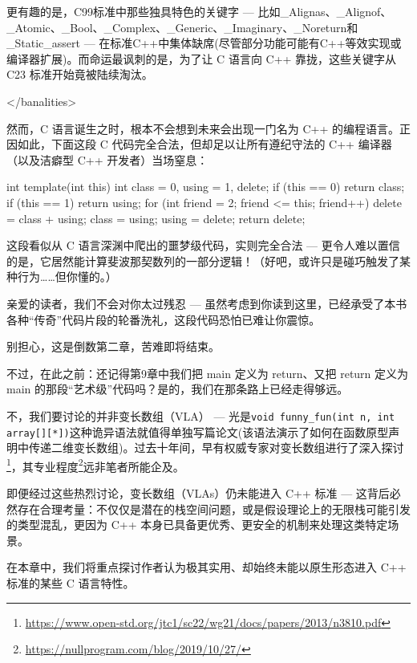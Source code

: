 更有趣的是，C99标准中那些独具特色的关键字 --- 比如\_Alignas、\_Alignof、\_Atomic、\_Bool、\_Complex、\_Generic、\_Imaginary、\_Noreturn和\_Static\_assert --- 在标准C++中集体缺席(尽管部分功能可能有C++等效实现或编译器扩展)。而命运最讽刺的是，为了让 C 语言向 C++ 靠拢，这些关键字从 C23 标准开始竟被陆续淘汰。

\begin{shell}
</banalities>
\end{shell}

然而，C 语言诞生之时，根本不会想到未来会出现一门名为 C++ 的编程语言。正因如此，下面这段 C 代码完全合法，但却足以让所有遵纪守法的 C++ 编译器（以及洁癖型 C++ 开发者）当场窒息：

\begin{cpp}
int template(int this) {
  int class = 0, using = 1, delete;
  if (this == 0) return class;
  if (this == 1) return using;
  for (int friend = 2; friend <= this; friend++) {
    delete = class + using;
    class = using;
    using = delete;
  }
  return delete;
}
\end{cpp}

这段看似从 C 语言深渊中爬出的噩梦级代码，实则完全合法 --- 更令人难以置信的是，它居然能计算斐波那契数列的一部分逻辑！（好吧，或许只是碰巧触发了某种行为……但你懂的。）

亲爱的读者，我们不会对你太过残忍 --- 虽然考虑到你读到这里，已经承受了本书各种“传奇”代码片段的轮番洗礼，这段代码恐怕已难让你震惊。

别担心，这是倒数第二章，苦难即将结束。

不过，在此之前：还记得第9章中我们把 main 定义为 return、又把 return 定义为 main 的那段“艺术级”代码吗？是的，我们在那条路上已经走得够远。

不，我们要讨论的并非变长数组（VLA） --- 光是\verb|void funny_fun(int n, int array[][*])|这种诡异语法就值得单独写篇论文(该语法演示了如何在函数原型声明中传递二维变长数组)。过去十年间，早有权威专家对变长数组进行了深入探讨\footnote{\url{https://www.open-std.org/jtc1/sc22/wg21/docs/papers/2013/n3810.pdf}}，其专业程度\footnote{\url{https://nullprogram.com/blog/2019/10/27/}}远非笔者所能企及。

即便经过这些热烈讨论，变长数组（VLAs）仍未能进入 C++ 标准 --- 这背后必然存在合理考量：不仅仅是潜在的栈空间问题，或是假设理论上的无限栈可能引发的类型混乱，更因为 C++ 本身已具备更优秀、更安全的机制来处理这类特定场景。

在本章中，我们将重点探讨作者认为极其实用、却始终未能以原生形态进入 C++ 标准的某些 C 语言特性。


